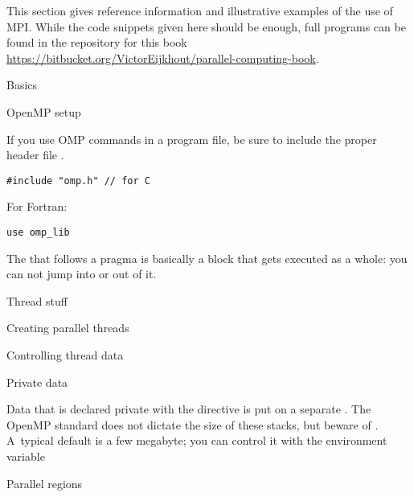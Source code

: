 
This section gives reference information and illustrative examples
of the use of MPI. While the code snippets given here should be enough,
full programs can be found in the repository for this book
\url{https://bitbucket.org/VictorEijkhout/parallel-computing-book}.

 {Basics}

 {OpenMP setup}

If you use OMP commands in a program file, be sure to include
the proper header file .
\begin{verbatim}
#include "omp.h" // for C
\end{verbatim}

For Fortran:
\begin{verbatim}
use omp_lib
\end{verbatim}
The  that follows a pragma is basically a block 
that gets executed as a whole: you can not jump into or out of it.

 {Thread stuff}

 {Creating parallel threads}



 {Controlling thread data}


 {Private data}

Data that is declared private with the  directive is
put on a separate . The OpenMP standard
does not dictate the size of these stacks, but beware of .
A~typical default
is a few megabyte; you can control it with the environment variable


 {Parallel regions}

